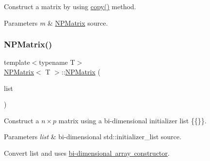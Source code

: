 Construct a matrix by using {\ttfamily \mbox{\hyperlink{class_n_p_matrix_ad2420de13cf39828daf36fd74aea9d2d}{copy()}}} method. 


\begin{DoxyParams}{Parameters}
{\em m} & {\ttfamily \mbox{\hyperlink{class_n_p_matrix}{N\+P\+Matrix}}} source. \\
\hline
\end{DoxyParams}
\mbox{\label{class_n_p_matrix_a738c748de3e3615da067264b629652b0}} 
\subsubsection{\texorpdfstring{NPMatrix()}{NPMatrix()}\hspace{0.1cm}{\footnotesize\ttfamily [4/7]}}
{\footnotesize\ttfamily template$<$typename T$>$ \\
\mbox{\hyperlink{class_n_p_matrix}{N\+P\+Matrix}}$<$ T $>$\+::\mbox{\hyperlink{class_n_p_matrix}{N\+P\+Matrix}} (\begin{DoxyParamCaption}\item[{initializer\+\_\+list$<$ initializer\+\_\+list$<$ T $>$$>$}]{list }\end{DoxyParamCaption})\hspace{0.3cm}{\ttfamily [inline]}}



Construct a $ n \times p $ matrix using a bi-\/dimensional initializer list {\ttfamily \{\{\}\}}. 


\begin{DoxyParams}{Parameters}
{\em list} & bi-\/dimensional {\ttfamily std\+::initializer\+\_\+list} source.\\
\hline
\end{DoxyParams}
Convert {\ttfamily list} and uses \mbox{\hyperlink{class_n_p_matrix_ad5fc4003cdc740be5eed12134929101c}{bi-\/dimensional array constructor}}. \mbox{\label{class_n_p_matrix_a70eca6f9b11e5ab39db67edcba220f34}} 
